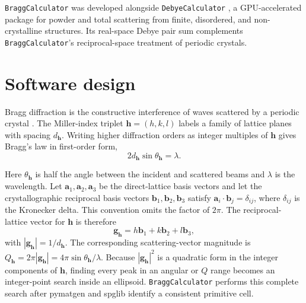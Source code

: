 \documentclass[10pt]{article}
\begin{document}
\texttt{BraggCalculator} was developed alongside \texttt{DebyeCalculator}
\citep{johansen2024}, a GPU-accelerated package for powder and total scattering
from finite, disordered, and non-crystalline structures. Its real-space Debye
pair sum complements \texttt{BraggCalculator}'s reciprocal-space treatment of
periodic crystals.

\section{Software design}

Bragg diffraction is the constructive interference of waves scattered by a
periodic crystal \citep{degraef2012}. The Miller-index triplet
$\mathbf{h}=(h,k,l)$ labels a family
of lattice planes with spacing $d_{\mathbf h}$. Writing higher diffraction
orders as integer multiples of $\mathbf h$ gives Bragg's law in first-order
form,
\begin{equation}
2d_{\mathbf{h}}\sin\theta_{\mathbf{h}} = \lambda.
\end{equation}

Here $\theta_{\mathbf h}$ is half the angle between the incident and scattered
beams and $\lambda$ is the wavelength. Let $\mathbf a_1,\mathbf a_2,\mathbf a_3$
be the direct-lattice basis vectors and let the crystallographic reciprocal
basis vectors $\mathbf b_1,\mathbf b_2,\mathbf b_3$ satisfy
$\mathbf a_i\cdot\mathbf b_j=\delta_{ij}$, where $\delta_{ij}$ is the Kronecker
delta. This convention omits the factor of $2\pi$. The reciprocal-lattice
vector for $\mathbf h$ is therefore
\begin{equation}
\mathbf g_{\mathbf h}=h\mathbf b_1+k\mathbf b_2+l\mathbf b_3,
\end{equation}
with $|\mathbf g_{\mathbf h}|=1/d_{\mathbf h}$. The corresponding
scattering-vector magnitude is
$Q_{\mathbf h}=2\pi|\mathbf g_{\mathbf h}|=
4\pi\sin\theta_{\mathbf h}/\lambda$. Because
$|\mathbf g_{\mathbf h}|^2$ is a quadratic form in the integer components of
$\mathbf h$, finding every peak in an angular or $Q$ range becomes an
integer-point search inside an ellipsoid. \texttt{BraggCalculator} performs
this complete search after pymatgen and spglib \citep{ong2013,togo2024}
identify a consistent primitive cell.
\end{document}
